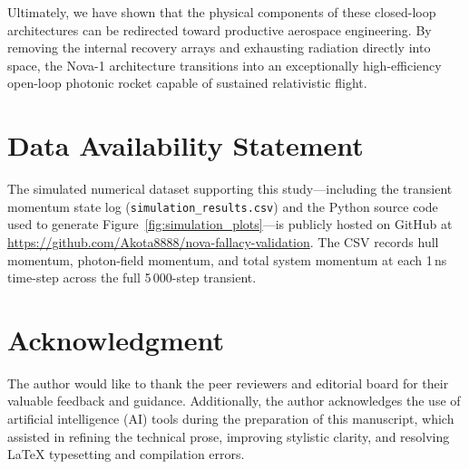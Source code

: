 \documentclass[journal,10pt,twoside]{IEEEtran}
\begin{document}
Ultimately, we have shown that the physical components of these closed-loop architectures can be redirected toward productive aerospace engineering. By removing the internal recovery arrays and exhausting radiation directly into space, the Nova-1 architecture transitions into an exceptionally high-efficiency open-loop photonic rocket capable of sustained relativistic flight.

\section*{Data Availability Statement}
The simulated numerical dataset supporting this study---including the transient momentum state log (\texttt{simulation\_results.csv}) and the Python source code used to generate Figure~\ref{fig:simulation_plots}---is publicly hosted on GitHub at \url{https://github.com/Akota8888/nova-fallacy-validation}. The CSV records hull momentum, photon-field momentum, and total system momentum at each 1\,ns time-step across the full 5\,000-step transient.

\section*{Acknowledgment}
The author would like to thank the peer reviewers and editorial board for their valuable feedback and guidance. Additionally, the author acknowledges the use of artificial intelligence (AI) tools during the preparation of this manuscript, which assisted in refining the technical prose, improving stylistic clarity, and resolving LaTeX typesetting and compilation errors.
\end{document}
